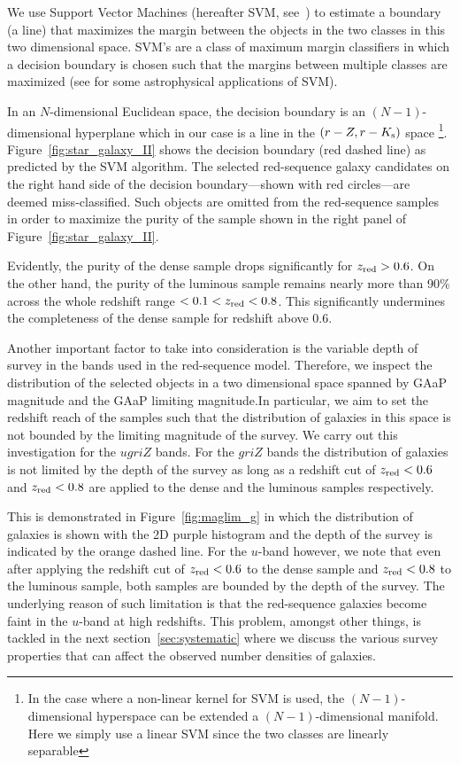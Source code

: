 \documentclass[fleqn,usenatbib,useAMS]{mnras}
\begin{document}
We use Support Vector Machines (hereafter SVM, see~\citealt{cristianini2000, scholkopf2000}) to estimate a boundary (a line) that maximizes the margin between the objects in the two classes in this two dimensional space. SVM's are a class of maximum margin  classifiers in which a decision boundary is chosen such that the margins between multiple classes are maximized (see \citealt{fadely2012, van2018} for some astrophysical applications of SVM).

In an $N$-dimensional Euclidean space, the decision boundary is an $(N-1)$-dimensional hyperplane which in our case is a line in the $(r-Z, r-K_{\rm s})$ space \footnote{In the case where a non-linear kernel for SVM is used, the $(N-1)$-dimensional hyperspace can be extended a $(N-1)$-dimensional manifold. Here we simply use a linear SVM since the two classes are linearly separable}. Figure~\ref{fig:star_galaxy_II} shows the decision boundary (red dashed line) as predicted by the SVM algorithm. The selected red-sequence galaxy candidates on the right hand side of the decision boundary---shown with red circles---are deemed miss-classified. Such objects are omitted from the red-sequence samples in order to maximize the purity of the sample shown in the right panel of Figure~\ref{fig:star_galaxy_II}. 

Evidently, the purity of the dense sample drops significantly for $z_{\rm red}>0.6$. On the other hand, the purity of the luminous sample remains nearly more than 90\% across the whole redshift range $<0.1<z_{\rm red}<0.8$. This significantly undermines the completeness of the dense sample for redshift above 0.6. 

Another important factor to take into consideration is the variable depth of survey in the bands used in the red-sequence model. Therefore, we inspect the distribution of the selected objects in a two dimensional space spanned by GAaP magnitude and the GAaP limiting magnitude.In particular, we aim to set the redshift reach of the samples such that the distribution of galaxies in this space is not bounded by the limiting magnitude of the survey. We carry out this investigation for the $ugriZ$ bands. For the $griZ$ bands the distribution of galaxies is not limited by the depth of the survey as long as a redshift cut of $z_{\rm red} < 0.6$ and $z_{\rm red} < 0.8$ are applied to the dense and the luminous samples respectively. 

This is demonstrated in Figure~\ref{fig:maglim_g} in which the distribution of galaxies is shown with the 2D purple histogram and the depth of the survey is indicated by the orange dashed line. For the $u$-band however, we note that even after applying the redshift cut of $z_{\rm red} < 0.6$ to the dense sample and $z_{\rm red} < 0.8$ to the luminous sample, both samples are bounded by the depth of the survey. The underlying reason of such limitation is that the red-sequence galaxies become faint in the $u$-band at high redshifts. This problem, amongst other things, is tackled in the next section~\ref{sec:systematic} where we discuss the various survey properties that can affect the observed number densities of galaxies.
\end{document}
